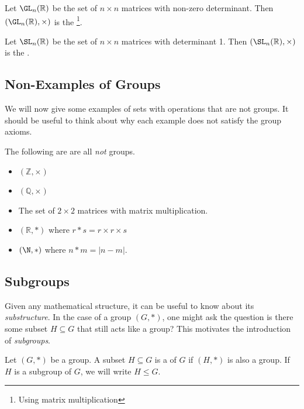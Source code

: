 \documentclass[a4paper]{scrartcl}
\begin{document}
\begin{example}
	Let $\GL_n(\mathbb{R})$ be the set of $n \times n$ matrices with non-zero determinant. Then $(\GL_n(\mathbb{R}), \times)$ is the \footnote{Using matrix multiplication}.
\end{example}

\begin{example}
	Let $\SL_n(\mathbb{R})$ be the set of $n \times n$ matrices with determinant 1. Then $(\SL_n(\mathbb{R}), \times)$ is the .
\end{example}

\subsection*{Non-Examples of Groups}

We will now give some examples of sets with operations that are not groups. It should be useful to think about why each example does not satisfy the group axioms.

\begin{example}
	The following are are all \emph{not} groups.
	\begin{itemize}
		\item $(\mathbb{Z}, \times)$
		\item $(\mathbb{Q}, \times)$
		\item The set of $2\times 2$ matrices with matrix multiplication.
		\item $(\mathbb{R}, *)$ where $r  * s = r\times r \times s$
		\item $(\N, *)$ where $n * m = |n - m|$.
	\end{itemize}
\end{example}

\subsection{Subgroups}

Given any mathematical structure, it can be useful to know about its \emph{substructure}. In the case of a group $(G, *)$, one might ask the question is there some subset $H \subseteq G$ that still acts like a group? This motivates the introduction of \emph{subgroups}.

\begin{definition}[Subgroups]
	Let $(G, *)$ be a group. A subset $H \subseteq G$ is a  of $G$ if $(H, *)$ is also a group. If $H$ is a subgroup of $G$, we will write $H \leq G$.
\end{definition}
\end{document}
